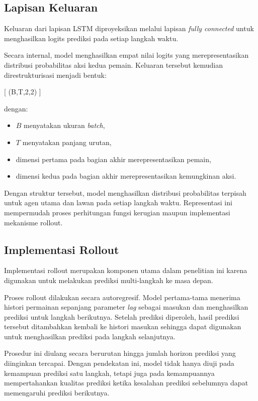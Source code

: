 \subsection{Lapisan Keluaran}

Keluaran dari lapisan LSTM diproyeksikan melalui lapisan \textit{fully connected} untuk menghasilkan logits prediksi pada setiap langkah waktu.

Secara internal, model menghasilkan empat nilai logits yang merepresentasikan distribusi probabilitas aksi kedua pemain. Keluaran tersebut kemudian direstrukturisasi menjadi bentuk:

[
(B,T,2,2)
]

dengan:

\begin{itemize}
\item $B$ menyatakan ukuran \textit{batch},
\item $T$ menyatakan panjang urutan,
\item dimensi pertama pada bagian akhir merepresentasikan pemain,
\item dimensi kedua pada bagian akhir merepresentasikan kemungkinan aksi.
\end{itemize}

Dengan struktur tersebut, model menghasilkan distribusi probabilitas terpisah untuk agen utama dan lawan pada setiap langkah waktu. Representasi ini mempermudah proses perhitungan fungsi kerugian maupun implementasi mekanisme rollout.

\subsection{Implementasi Rollout}

Implementasi rollout merupakan komponen utama dalam penelitian ini karena digunakan untuk melakukan prediksi multi-langkah ke masa depan.

Proses rollout dilakukan secara autoregresif. Model pertama-tama menerima histori permainan sepanjang parameter \textit{lag} sebagai masukan dan menghasilkan prediksi untuk langkah berikutnya. Setelah prediksi diperoleh, hasil prediksi tersebut ditambahkan kembali ke histori masukan sehingga dapat digunakan untuk menghasilkan prediksi pada langkah selanjutnya.

Prosedur ini diulang secara berurutan hingga jumlah horizon prediksi yang diinginkan tercapai. Dengan pendekatan ini, model tidak hanya diuji pada kemampuan prediksi satu langkah, tetapi juga pada kemampuannya mempertahankan kualitas prediksi ketika kesalahan prediksi sebelumnya dapat memengaruhi prediksi berikutnya.

